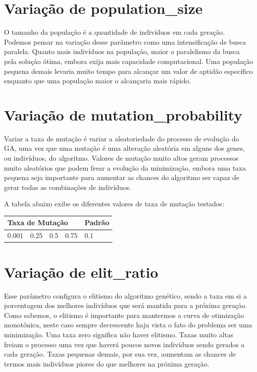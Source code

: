 \documentclass[12pt]{article}
\begin{document}
\section{Variação de population\_size}

O tamanho da população é a quantidade de indivíduos em cada geração. Podemos pensar na variação desse parâmetro como uma intensificação de busca paralela. Quanto mais indivíduos na população, maior o paralelismo da busca pela solução ótima, embora exija mais capacidade computacional. Uma população pequena demais levaria muito tempo para alcançar um valor de aptidão específico enquanto que uma população maior o alcançaria mais rápido.

\section{Variação de mutation\_probability}

Variar a taxa de mutação é variar a aleatoriedade do processo de evolução do GA, uma vez que uma mutação é uma alteração aleatória em alguns dos genes, ou indivíduos, do algoritmo. Valores de mutação muito altos geram processos muito aleatórios que podem frear a evolução da minimização, embora uma taxa pequena seja importante para aumentar as chances do algoritmo ser capaz de gerar todas as combinações de indivíduos.

A tabela abaixo exibe os diferentes valores de taxa de mutação testados:

\begin{table}[]
	\begin{tabular}{|l|l|l|l|l|}
		\hline
		\multicolumn{4}{|l|}{Taxa de Mutação} & Padrão \\ \hline
		0.001    & 0.25    & 0.5    & 0.75    & 0.1    \\ \hline
	\end{tabular}
\end{table}

\section{Variação de elit\_ratio}

Esse parâmetro configura o elitismo do algoritmo genético, sendo a taxa em si a porcentagem dos melhores indivíduos que será mantida para a próxima geração. Como sabemos, o elitismo é importante para mantermos a curva de otimização monotônica, neste caso sempre decrescente haja vista o fato do problema ser uma minimização. Uma taxa zero significa não haver elitismo. Taxas muito altas freiam o processo uma vez que haverá poucos novos indivíduos sendo gerados a cada geração. Taxas pequenas demais, por sua vez, aumentam as chances de termos mais indivíduos piores do que melhores na próxima geração.
\end{document}
